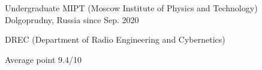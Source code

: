 
\begin{cventries}

  \cventry
    {Undergraduate} %
    {MIPT (Moscow Institute of Physics and Technology)} %
    {Dolgoprudny, Russia} %
    {since Sep. 2020} %
    {
      \begin{cvitems} %
        \item {DREC (Department of Radio Engineering and Cybernetics)}
        \item {Average point 9.4/10}
      \end{cvitems}
    }

\end{cventries}

